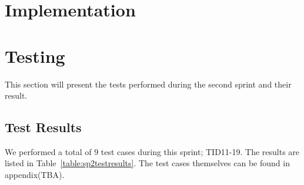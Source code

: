 \section{Implementation}


\section{Testing}
This section will present the tests performed during the second sprint and their result.

\subsection{Test Results}
We performed a total of 9 test cases during this sprint; TID11-19. The results are listed in Table~\ref{table:sp2testresults}. The test cases themselves can be found in appendix(TBA).

